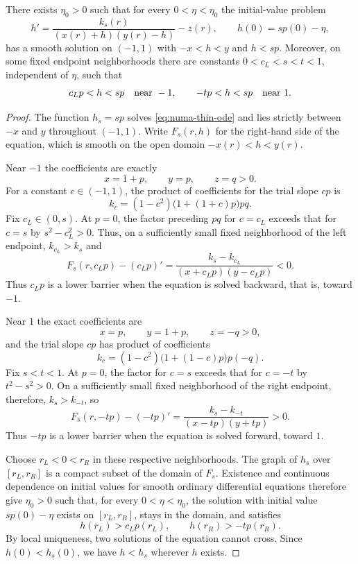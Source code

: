\begin{lemma}\label{lem:numa-thin-trapping}
There exists $\eta_0>0$ such that for every $0<\eta<\eta_0$ the initial-value problem
\begin{equation}\label{eq:numa-thin-ode}
 h'=\frac{k_s(r)}{(x(r)+h)(y(r)-h)}-z(r),
 \qquad h(0)=sp(0)-\eta,
\end{equation}
has a smooth solution on $(-1,1)$ with $-x<h<y$ and $h<sp$. Moreover, on some fixed endpoint neighborhoods there are constants $0<c_L<s<t<1$, independent of $\eta$, such that
\[
 c_Lp<h<sp\quad\hbox{near }-1,
 \qquad -tp<h<sp\quad\hbox{near }1.
\]
\end{lemma}
\begin{proof}
The function $h_s=sp$ solves \eqref{eq:numa-thin-ode} and lies strictly between $-x$ and $y$ throughout $(-1,1)$. Write $F_s(r,h)$ for the right-hand side of the equation, which is smooth on the open domain $-x(r)<h<y(r)$.

Near $-1$ the coefficients are exactly
\[
 x=1+p,\qquad y=p,\qquad z=q>0.
\]
For a constant $c\in(-1,1)$, the product of coefficients for the trial slope $cp$ is
\[
 k_c=(1-c^2)\bigl(1+(1+c)p\bigr)pq.
\]
Fix $c_L\in(0,s)$. At $p=0$, the factor preceding $pq$ for $c=c_L$ exceeds that for $c=s$ by $s^2-c_L^2>0$. Thus, on a sufficiently small fixed neighborhood of the left endpoint, $k_{c_L}>k_s$ and
\begin{equation}\label{eq:numa-left-trap}
 F_s(r,c_Lp)-(c_Lp)'=
 \frac{k_s-k_{c_L}}{(x+c_Lp)(y-c_Lp)}<0.
\end{equation}
Thus $c_Lp$ is a lower barrier when the equation is solved backward, that is, toward $-1$.

Near $1$ the exact coefficients are
\[
 x=p,\qquad y=1+p,\qquad z=-q>0,
\]
and the trial slope $cp$ has product of coefficients
\[
 k_c=(1-c^2)\bigl(1+(1-c)p\bigr)p(-q).
\]
Fix $s<t<1$. At $p=0$, the factor for $c=s$ exceeds that for $c=-t$ by $t^2-s^2>0$. On a sufficiently small fixed neighborhood of the right endpoint, therefore, $k_s>k_{-t}$, so
\begin{equation}\label{eq:numa-right-trap}
 F_s(r,-tp)-(-tp)'=
 \frac{k_s-k_{-t}}{(x-tp)(y+tp)}>0.
\end{equation}
Thus $-tp$ is a lower barrier when the equation is solved forward, toward $1$.

Choose $r_L<0<r_R$ in these respective neighborhoods. The graph of $h_s$ over $[r_L,r_R]$ is a compact subset of the domain of $F_s$. Existence and continuous dependence on initial values for smooth ordinary differential equations therefore give $\eta_0>0$ such that, for every $0<\eta<\eta_0$, the solution with initial value $sp(0)-\eta$ exists on $[r_L,r_R]$, stays in the domain, and satisfies
\[
 h(r_L)>c_Lp(r_L),\qquad h(r_R)>-tp(r_R).
\]
By local uniqueness, two solutions of the equation cannot cross. Since $h(0)<h_s(0)$, we have $h<h_s$ wherever $h$ exists.


\end{proof}
